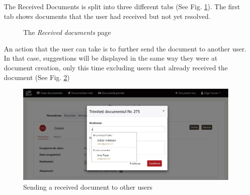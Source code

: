 The Received Documents is split into three different tabs (See Fig. \ref{receivedDocs}). The first tab shows documents that the user had received but not yet resolved.

\begin{figure}[ht]
    \centering
    \qquad
    \caption{The \textit{Received documents} page}
    \label{receivedDocs}
\end{figure}

An action that the user can take is to further send the document to another user. In that case, suggestions will be displayed in the same way they were at document creation, only this time excluding users that already received the document (See Fig. \ref{resendModal})

\begin{figure}[H]
    \centering
    \includegraphics[width=5.5in]{images/app/received_resend_modal}
    \caption{Sending a received document to other users}
    \label{resendModal}
\end{figure}

